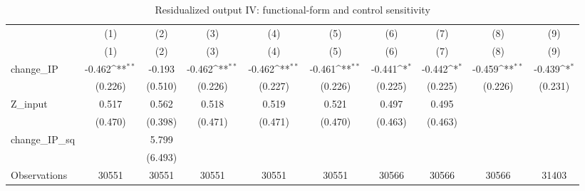 \begin{table}[htbp]\centering
\def\sym#1{\ifmmode^{#1}\else\(^{#1}\)\fi}
\caption{Residualized output IV: functional-form and control sensitivity}
\begin{tabular}{l*{9}{c}}
\hline\hline
            &\multicolumn{1}{c}{(1)}&\multicolumn{1}{c}{(2)}&\multicolumn{1}{c}{(3)}&\multicolumn{1}{c}{(4)}&\multicolumn{1}{c}{(5)}&\multicolumn{1}{c}{(6)}&\multicolumn{1}{c}{(7)}&\multicolumn{1}{c}{(8)}&\multicolumn{1}{c}{(9)}\\
            &\multicolumn{1}{c}{(1)}&\multicolumn{1}{c}{(2)}&\multicolumn{1}{c}{(3)}&\multicolumn{1}{c}{(4)}&\multicolumn{1}{c}{(5)}&\multicolumn{1}{c}{(6)}&\multicolumn{1}{c}{(7)}&\multicolumn{1}{c}{(8)}&\multicolumn{1}{c}{(9)}\\
\hline
change\_IP   &      -0.462\sym{**} &      -0.193         &      -0.462\sym{**} &      -0.462\sym{**} &      -0.461\sym{**} &      -0.441\sym{*}  &      -0.442\sym{*}  &      -0.459\sym{**} &      -0.439\sym{*}  \\
            &     (0.226)         &     (0.510)         &     (0.226)         &     (0.227)         &     (0.226)         &     (0.225)         &     (0.225)         &     (0.226)         &     (0.231)         \\
[1em]
Z\_input     &       0.517         &       0.562         &       0.518         &       0.519         &       0.521         &       0.497         &       0.495         &                     &                     \\
            &     (0.470)         &     (0.398)         &     (0.471)         &     (0.471)         &     (0.470)         &     (0.463)         &     (0.463)         &                     &                     \\
[1em]
change\_IP\_sq&                     &       5.799         &                     &                     &                     &                     &                     &                     &                     \\
            &                     &     (6.493)         &                     &                     &                     &                     &                     &                     &                     \\
\hline
Observations&       30551         &       30551         &       30551         &       30551         &       30551         &       30566         &       30566         &       30566         &       31403         \\

\end{tabular}
\end{table}
